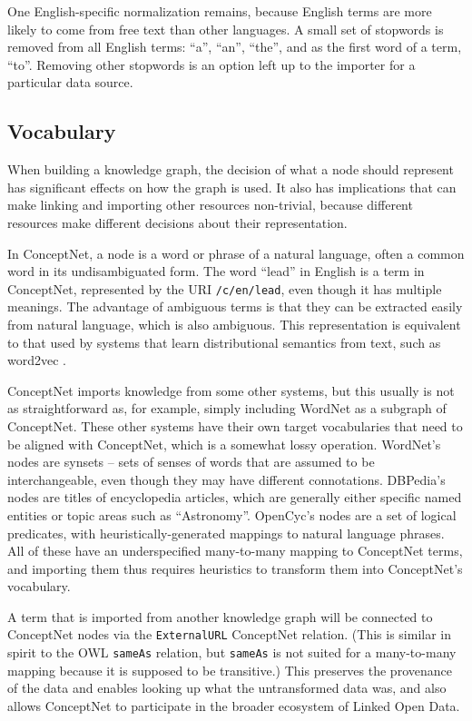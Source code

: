 \documentclass[letterpaper]{article}
\begin{document}
One English-specific normalization remains, because English terms are more
likely to come from free text than other languages. A small set of stopwords is
removed from all English terms: ``a'', ``an'', ``the'', and as the first word
of a term, ``to''. Removing other stopwords is an option left up to the
importer for a particular data source.


\subsection{Vocabulary}\label{vocabulary}

When building a knowledge graph, the decision of what a node should
represent has significant effects on how the graph is used. It also has
implications that can make linking and importing other resources
non-trivial, because different resources make different decisions about
their representation.

In ConceptNet, a node is a word or phrase of a natural language, often a
common word in its undisambiguated form. The word ``lead'' in English is
a term in ConceptNet, represented by the URI \texttt{/c/en/lead}, even
though it has multiple meanings. The advantage of ambiguous terms is
that they can be extracted easily from natural language, which is also
ambiguous. This representation is equivalent to that used by systems
that learn distributional semantics from text, such as word2vec
\cite{mikolov2013word2vec}.

ConceptNet imports knowledge from some other systems, but this usually
is not as straightforward as, for example, simply including WordNet as a
subgraph of ConceptNet. These other systems have their own target
vocabularies that need to be aligned with ConceptNet, which is a
somewhat lossy operation. WordNet's nodes are synsets -- sets of senses
of words that are assumed to be interchangeable, even though they may
have different connotations. DBPedia's nodes are titles of encyclopedia
articles, which are generally either specific named entities or topic
areas such as ``Astronomy''. OpenCyc's nodes are a set of logical
predicates, with heuristically-generated mappings to natural language
phrases. All of these have an underspecified many-to-many mapping to
ConceptNet terms, and importing them thus requires heuristics to
transform them into ConceptNet's vocabulary.

A term that is imported from another knowledge graph will be connected
to ConceptNet nodes via the \texttt{ExternalURL} ConceptNet relation.
(This is similar in spirit to the OWL \texttt{sameAs} relation, but
\texttt{sameAs} is not suited for a many-to-many mapping because it is
supposed to be transitive.) This preserves the provenance of the data
and enables looking up what the untransformed data was, and also allows
ConceptNet to participate in the broader ecosystem of Linked Open Data.
\end{document}
